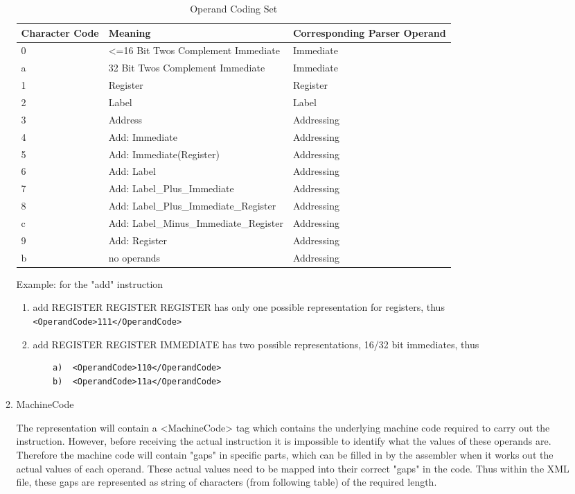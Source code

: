 \begin{enumerate}
\begin{enumerate}
\begin{table}[]
\begin{center}
	\begin{tabular}{|p{0.5in}|l|p{1.5in}|}
	\hline
	Character Code & Meaning & Corresponding Parser Operand \\
	\hline
	0	&	<=16 Bit Twos Complement Immediate		&	Immediate \\
	a	&	32 Bit Twos Complement Immediate		&	Immediate \\
	1	&	Register								&	Register \\
	2	&	Label									&	Label \\
	3	&	Address									&	Addressing \\
	4	&	Add: Immediate							&	Addressing \\
	5	&	Add: Immediate(Register)				&	Addressing \\
	6	&	Add: Label								&	Addressing \\
	7	&	Add: Label\_Plus\_Immediate				&	Addressing \\
	8	&	Add: Label\_Plus\_Immediate\_Register	&	Addressing \\
	c	&	Add: Label\_Minus\_Immediate\_Register	&	Addressing \\
	9	&	Add: Register							&	Addressing \\
	b	&	no operands								&	Addressing \\
	\hline
	\end{tabular}
\caption{Operand Coding Set}
\end{center}
\end{table}

Example: for the "add" instruction

\begin{enumerate}
\item add REGISTER REGISTER REGISTER has only one possible representation for registers, thus \verb"<OperandCode>111</OperandCode>"
\item add REGISTER REGISTER IMMEDIATE has two possible representations, 16/32 bit immediates, thus
\begin{verbatim}
	a)	<OperandCode>110</OperandCode>
	b)	<OperandCode>11a</OperandCode>
\end{verbatim}

\end{enumerate}
	
\item MachineCode

The representation will contain a <MachineCode> tag which contains the underlying machine code required to carry out the instruction. However, before receiving the actual instruction it is impossible to identify what the values of these operands are. Therefore the machine code will contain "gaps" in specific parts, which can be filled in by the assembler when it works out the actual values of each operand. These actual values need to be mapped into their correct "gaps" in the code. Thus within the XML file, these gaps are represented as string of characters (from following table) of the required length.



\end{enumerate}
\end{enumerate}
